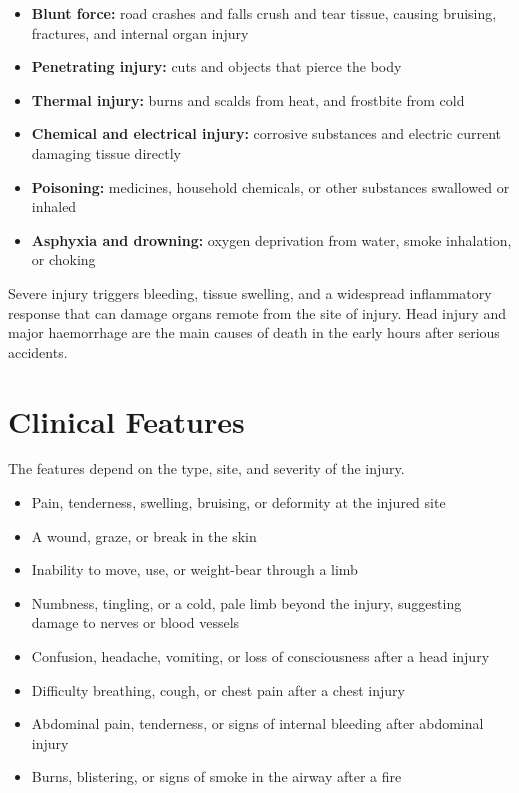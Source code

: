 \begin{itemize}
    \item \textbf{Blunt force:} road crashes and falls crush and tear tissue, causing bruising, fractures, and internal organ injury
    \item \textbf{Penetrating injury:} cuts and objects that pierce the body
    \item \textbf{Thermal injury:} burns and scalds from heat, and frostbite from cold
    \item \textbf{Chemical and electrical injury:} corrosive substances and electric current damaging tissue directly
    \item \textbf{Poisoning:} medicines, household chemicals, or other substances swallowed or inhaled
    \item \textbf{Asphyxia and drowning:} oxygen deprivation from water, smoke inhalation, or choking
\end{itemize}

Severe injury triggers bleeding, tissue swelling, and a widespread inflammatory response that can damage organs remote from the site of injury. Head injury and major haemorrhage are the main causes of death in the early hours after serious accidents.

\section*{Clinical Features}
The features depend on the type, site, and severity of the injury.

\begin{itemize}
    \item Pain, tenderness, swelling, bruising, or deformity at the injured site
    \item A wound, graze, or break in the skin
    \item Inability to move, use, or weight-bear through a limb
    \item Numbness, tingling, or a cold, pale limb beyond the injury, suggesting damage to nerves or blood vessels
    \item Confusion, headache, vomiting, or loss of consciousness after a head injury
    \item Difficulty breathing, cough, or chest pain after a chest injury
    \item Abdominal pain, tenderness, or signs of internal bleeding after abdominal injury
    \item Burns, blistering, or signs of smoke in the airway after a fire
\end{itemize}

